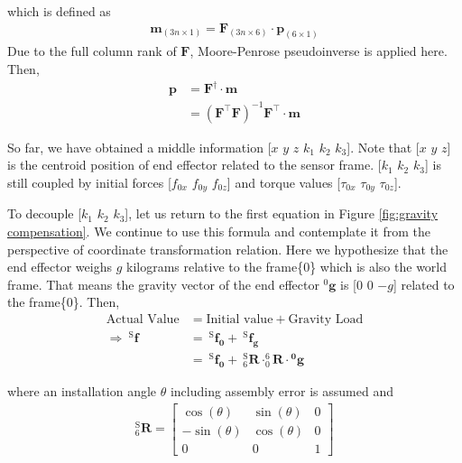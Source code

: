 which is defined as 
\begin{equation*}
\begin{split}
\boldsymbol{m}_{\left(3n \times 1\right)} = \mathbf{F}_{\left(3n \times 6\right)} \cdot \boldsymbol{p}_{\left(6 \times 1\right)}
\end{split}
\end{equation*}
Due to the full column rank of $\mathbf{F}$, Moore-Penrose pseudoinverse is applied here. Then, 
\begin{equation*}
\begin{split}
\boldsymbol{p} 	&= \mathbf{F}^{\dagger} \cdot \boldsymbol{m}\\
				&= \left( \mathbf{F}^\top\mathbf{F}\right) ^{-1}\mathbf{F}^\top \cdot \boldsymbol{m}
\end{split}
\end{equation*}
\par
So far, we have obtained a middle information [$x$ $y$ $z$ $k_1$ $k_2$ $k_3$]. Note that [$x$ $y$ $z$] is the centroid position of end effector related to the sensor frame. [$k_1$ $k_2$ $k_3$] is still coupled by initial forces [$f_{0x}$ $f_{0y}$ $f_{0z}$] and torque values [$\tau_{0x}$ $\tau_{0y}$ $\tau_{0z}$].
\par
To decouple [$k_1$ $k_2$ $k_3$], let us return to the first equation in Figure \ref{fig:gravity compensation}. We continue to use this formula and contemplate it from the perspective of coordinate transformation relation. Here we hypothesize that the end effector weighs $g$ kilograms relative to the frame\{0\} which is also the world frame. That means the gravity vector of the end effector $^{0}\boldsymbol{g}$ is [$0$ $0$ $-g$] related to the frame\{0\}. Then,
\begin{equation}
\label{eq:ffrrg}
\begin{split}
\text{Actual Value} &= \text{Initial value}	+ \text{Gravity Load}\\
\Rightarrow\ 
^\mathrm{S}\!\boldsymbol{f}		&= \ ^\mathrm{S}\!\boldsymbol{f_0} +\ ^\mathrm{S}\!\boldsymbol{f_g}\\
					&= \ ^\mathrm{S}\!\boldsymbol{f_0} +\ ^\mathrm{S}_6\mathbf{R} \cdot ^6_0\!\mathbf{R} \cdot \boldsymbol{^0\!g}
\end{split}
\end{equation}
\par\noindent
where an installation angle $\theta$ including assembly error is assumed and  
\begin{equation}
\begin{split}
 ^\mathrm{S}_6\mathbf{R}
=
\begin{bmatrix}
\cos(\theta)	&\sin(\theta)	&0 \\
-\sin(\theta)	&\cos(\theta)	&0 \\
0				&0				&1
\end{bmatrix}
\end{split}
\end{equation}
